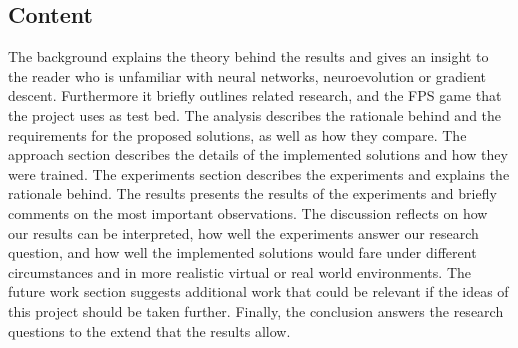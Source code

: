 \subsection{Content}
The background explains the theory behind the results and gives an insight to the reader who is unfamiliar with neural networks, neuroevolution or gradient descent. Furthermore it briefly outlines related research, and the FPS game that the project uses as test bed. The analysis describes the rationale behind and the requirements for the proposed solutions, as well as how they compare. The approach section describes the details of the implemented solutions and how they were trained. The experiments section describes the experiments and explains the rationale behind. The results presents the results of the experiments and briefly comments on the most important observations. The discussion reflects on how our results can be interpreted, how well the experiments answer our research question, and how well the implemented solutions would fare under different circumstances and in more realistic virtual or real world environments. The future work section suggests additional work that could be relevant if the ideas of this project should be taken further. Finally, the conclusion answers the research questions to the extend that the results allow.



























